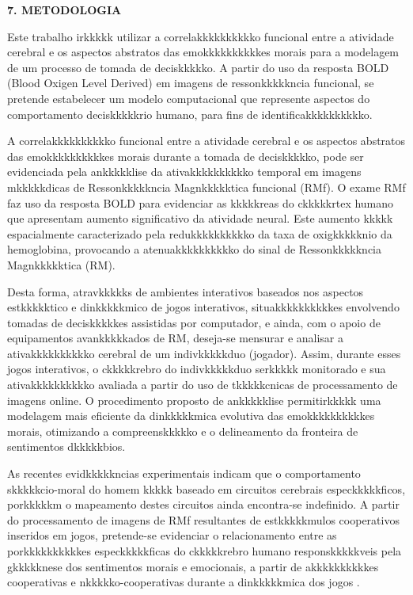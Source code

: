 \documentclass[a4paper,12pt,oneside,openany]{report}
\begin{document}
\vspace{0.4cm}
\textbf{7. METODOLOGIA}

Este trabalho irkkkkk utilizar a correlakkkkkkkkkko funcional entre a atividade cerebral e os aspectos abstratos das emokkkkkkkkkkes morais para a modelagem de um processo de tomada de deciskkkkko. A partir do uso da resposta BOLD (Blood Oxigen Level Derived) em imagens de ressonkkkkkncia funcional, se pretende estabelecer um modelo computacional que represente aspectos do comportamento deciskkkkkrio humano, para fins de identificakkkkkkkkkko. 
  
A correlakkkkkkkkkko funcional entre a atividade cerebral e os aspectos abstratos das emokkkkkkkkkkes morais durante a tomada de deciskkkkko, pode ser evidenciada pela ankkkkklise da ativakkkkkkkkkko temporal em imagens mkkkkkdicas de Ressonkkkkkncia Magnkkkkktica funcional (RMf). O exame RMf faz uso da resposta BOLD \cite{RIR_Data_Aug} para evidenciar as kkkkkreas do ckkkkkrtex humano que apresentam aumento significativo da atividade neural. Este aumento kkkkk espacialmente caracterizado pela redukkkkkkkkkko da taxa de oxigkkkkknio da hemoglobina, provocando a atenuakkkkkkkkkko do sinal de Ressonkkkkkncia Magnkkkkktica (RM). 

Desta forma, atravkkkkks de ambientes interativos baseados nos aspectos estkkkkktico e dinkkkkkmico de jogos interativos, situakkkkkkkkkkes envolvendo tomadas de deciskkkkkes assistidas por computador, e ainda, com o apoio de equipamentos avankkkkkados de RM, deseja-se mensurar e analisar a ativakkkkkkkkkko cerebral de um indivkkkkkduo (jogador). Assim, durante esses jogos interativos, o ckkkkkrebro do indivkkkkkduo serkkkkk monitorado e sua ativakkkkkkkkkko avaliada a partir do uso de tkkkkkcnicas de processamento de imagens online. O procedimento proposto de ankkkkklise permitirkkkkk uma modelagem mais eficiente da dinkkkkkmica evolutiva das emokkkkkkkkkkes morais, otimizando a compreenskkkkko e o delineamento da fronteira de sentimentos dkkkkkbios.

As recentes evidkkkkkncias experimentais indicam que o comportamento skkkkkcio-moral do homem kkkkk baseado em circuitos cerebrais especkkkkkficos, porkkkkkm o mapeamento destes circuitos ainda encontra-se indefinido. A partir do processamento de imagens de RMf resultantes de estkkkkkmulos cooperativos inseridos em jogos, pretende-se evidenciar o relacionamento entre as porkkkkkkkkkkes especkkkkkficas do ckkkkkrebro humano responskkkkkveis pela gkkkkknese dos sentimentos morais e emocionais, a partir de akkkkkkkkkkes cooperativas e nkkkkko-cooperativas durante a dinkkkkkmica dos jogos \cite{Binmore92}.  
\end{document}
